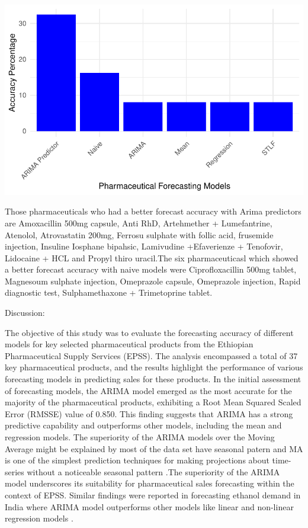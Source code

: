 \documentclass[
  authoryear,
  preprint,
  3p]{elsarticle}
\begin{document}
\includegraphics{main_files/figure-pdf/unnamed-chunk-43-1.pdf}

Those pharmaceuticals who had a better forecast accuracy with Arima
predictors are Amoxacillin 500mg capsule, Anti RhD, Artehmether +
Lumefantrine, Atenolol, Atrovastatin 200mg, Ferrosu sulphate with follic
acid, frusemide injection, Insuline Iosphane bipahsic, Lamivudine
+Efaverienze + Tenofovir, Lidocaine + HCL and Propyl thiro uracil.The
six pharmaceuticasl which showed a better forecast accuracy with naive
models were Ciprofloxacillin 500mg tablet, Magnesoum sulphate injection,
Omeprazole capsule, Omeprazole injection, Rapid diagnostic test,
Sulphamethaxone + Trimetoprine tablet.

Discussion:

The objective of this study was to evaluate the forecasting accuracy of
different models for key selected pharmaceutical products from the
Ethiopian Pharmaceutical Supply Services (EPSS). The analysis
encompassed a total of 37 key pharmaceutical products, and the results
highlight the performance of various forecasting models in predicting
sales for these products. In the initial assessment of forecasting
models, the ARIMA model emerged as the most accurate for the majority of
the pharmaceutical products, exhibiting a Root Mean Squared Scaled Error
(RMSSE) value of 0.850. This finding suggests that ARIMA has a strong
predictive capability and outperforms other models, including the mean
and regression models. The superiority of the ARIMA models over the
Moving Average might be explained by most of the data set have seasonal
patern and MA is one of the simplest prediction techniques for making
projections about time-series without a noticeable seasonal pattern
\citep{chopra2001supply}.The superiority of the ARIMA model underscores
its suitability for pharmaceutical sales forecasting within the context
of EPSS. Similar findings were reported in forecasting ethanol demand in
India where ARIMA model outperforms other models like linear and
non-linear regression models \citep{dey2023forecasting}.
\end{document}
